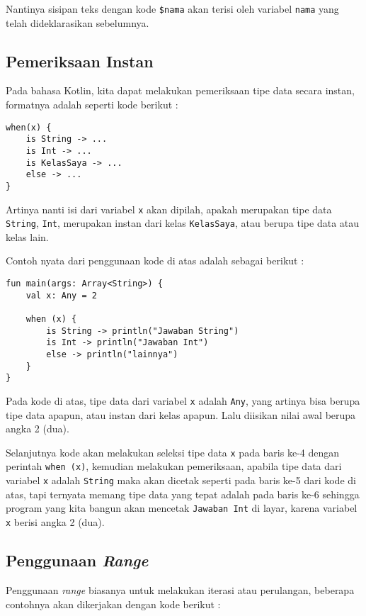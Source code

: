 Nantinya sisipan teks dengan kode \texttt{\$nama} akan terisi oleh variabel \texttt{nama} yang telah dideklarasikan sebelumnya.

\subsection{Pemeriksaan Instan}

Pada bahasa Kotlin, kita dapat melakukan pemeriksaan tipe data secara instan, formatnya adalah seperti kode berikut :

\begin{lstlisting}
when(x) {
	is String -> ...
	is Int -> ...
	is KelasSaya -> ...
	else -> ...
}
\end{lstlisting}

Artinya nanti isi dari variabel \texttt{x} akan dipilah, apakah merupakan tipe data \texttt{String}, \texttt{Int}, merupakan instan dari kelas \texttt{KelasSaya}, atau berupa tipe data atau kelas lain.

Contoh nyata dari penggunaan kode di atas adalah sebagai berikut :

\begin{lstlisting}
fun main(args: Array<String>) {
	val x: Any = 2

	when (x) {
		is String -> println("Jawaban String")
		is Int -> println("Jawaban Int")
		else -> println("lainnya")
	}
}
\end{lstlisting}

Pada kode di atas, tipe data dari variabel \texttt{x} adalah \texttt{Any}, yang artinya bisa berupa tipe data apapun, atau instan dari kelas apapun. Lalu diisikan nilai awal berupa angka 2 (dua).

Selanjutnya kode akan melakukan seleksi tipe data \texttt{x} pada baris ke-4 dengan perintah \texttt{when (x)}, kemudian melakukan pemeriksaan, apabila tipe data dari variabel \texttt{x} adalah \texttt{String} maka akan dicetak seperti pada baris ke-5 dari kode di atas, tapi ternyata memang tipe data yang tepat adalah pada baris ke-6 sehingga program yang kita bangun akan mencetak \texttt{Jawaban Int} di layar, karena variabel \texttt{x} berisi angka 2 (dua).

\subsection{Penggunaan \textit{Range}}

Penggunaan \textit{range} biasanya untuk melakukan iterasi atau perulangan, beberapa contohnya akan dikerjakan dengan kode berikut :

